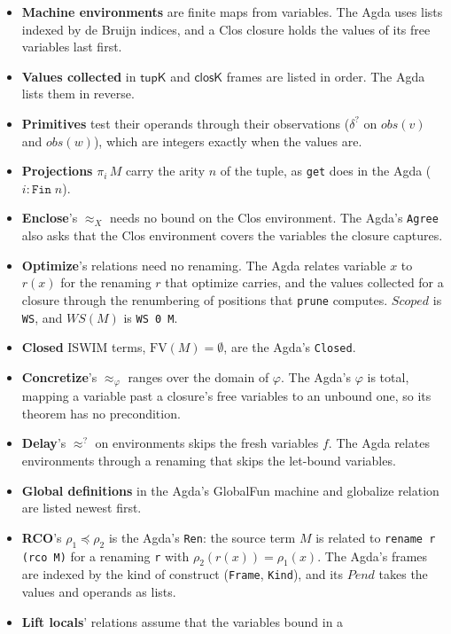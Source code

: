 \documentclass[10pt]{article}
\theoremstyle{acmplain}
\newcommand{\key}[1]{\mathsf{#1}}
\newcommand{\prj}[1]{\pi_{#1}\,}
\newcommand{\FV}{\mathrm{FV}}
\newcommand{\obs}{\mathit{obs}}
\begin{document}
\begin{itemize}
\item \textbf{Machine environments} are finite maps from variables.
  The Agda uses lists indexed by de Bruijn indices, and a Clos closure
  holds the values of its free variables last first.
\item \textbf{Values collected} in $\key{tupK}$ and $\key{closK}$ frames are
  listed in order. The Agda lists them in reverse.
\item \textbf{Primitives} test their operands through their observations
  ($\delta^?$ on $\obs(v)$ and $\obs(w)$), which are integers
  exactly when the values are.
\item \textbf{Projections} $\prj{i} M$ carry the arity $n$ of the tuple,
  as \texttt{get} does in the Agda ($i : \mathtt{Fin}\;n$).
\item \textbf{Enclose}'s $\approx_X$ needs no bound on the Clos environment.
  The Agda's \texttt{Agree} also asks that the Clos environment covers
  the variables the closure captures.
\item \textbf{Optimize}'s relations need no renaming. The Agda relates
  variable $x$ to $r(x)$ for the renaming $r$ that optimize carries, and
  the values collected for a closure through the renumbering of positions
  that \texttt{prune} computes. $\mathit{Scoped}$ is \texttt{WS}, and
  $\mathit{WS}(M)$ is \texttt{WS 0 M}.
\item \textbf{Closed} ISWIM terms, $\FV(M) = \emptyset$, are the Agda's
  \texttt{Closed}.
\item \textbf{Concretize}'s $\approx_\varphi$ ranges over the domain of
  $\varphi$. The Agda's $\varphi$ is total, mapping a variable past a
  closure's free variables to an unbound one, so its theorem has no
  precondition.
\item \textbf{Delay}'s $\approx^{?}$ on environments skips the fresh variables $f$.
  The Agda relates environments through a renaming that skips the
  let-bound variables.
\item \textbf{Global definitions} in the Agda's GlobalFun machine and globalize
  relation are listed newest first.
\item \textbf{RCO}'s $\rho_1 \preceq \rho_2$ is the Agda's \texttt{Ren}: the
  source term $M$ is related to \texttt{rename r (rco M)} for a renaming
  \texttt{r} with $\rho_2(r(x)) = \rho_1(x)$. The Agda's frames are indexed
  by the kind of construct (\texttt{Frame}, \texttt{Kind}), and its
  $\mathit{Pend}$ takes the values and operands as lists.
\item \textbf{Lift locals}' relations assume that the variables bound in a

\end{itemize}
\end{document}
